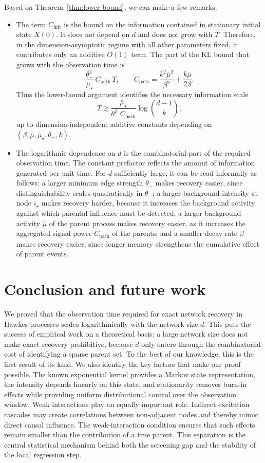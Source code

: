 \documentclass{article}
\newcommand{\thetalo}{\theta_-}
\begin{document}
Based on Theorem~\ref{thm:lower-bound}, we can make a few remarks:
\begin{itemize}
\item The term $C_{\mathrm{init}}$ is the bound on the information contained in stationary initial state $X(0)$. It does \emph{not} depend on $d$ and does not grow with $T$. Therefore, in the dimension-asymptotic regime with all other parameters fixed, it contributes only an additive $O(1)$ term. The part of the KL bound that grows with the observation time is
\[
\frac{\thetalo^2}{\bar\mu_\star}\,C_{\mathrm{path}}\,T,
\qquad
C_{\mathrm{path}}
=
\frac{k^2\bar\mu^2}{\beta^2}
+
\frac{k\bar\mu}{2\beta}.
\]
Thus the lower-bound argument identifies the necessary information scale
\[
T
\gtrsim
\frac{\bar\mu_\star}{\thetalo^2\,C_{\mathrm{path}}}
\log \binom{d-1}{k},
\]
up to dimension-independent additive constants depending on
$(\beta,\bar\mu,\bar\mu_\star,\thetalo,k)$.
\item The logarithmic dependence on \(d\) is the combinatorial part of the required observation time. The constant prefactor reflects the amount of information generated per unit time. For $d$ sufficiently large, it can be read informally as follows: a larger minimum edge strength $\thetalo$ makes recovery easier, since distinguishability scales quadratically in $\thetalo$; a larger background intensity at node $i_\star$ makes recovery harder, because it increases the background activity against which parental influence must be detected; a larger background activity $\bar\mu$ of the parent process makes recovery easier, as it increases the aggregated signal power $C_{\mathrm{path}}$ of the parents; and a smaller decay rate $\beta$ makes recovery easier, since longer memory strengthens the cumulative effect of parent events.
\end{itemize}

\section{Conclusion and future work}
\label{sec: conclusion}
We proved that the observation time required for exact network recovery in Hawkes processes scales logarithmically with the network size $d$.
This puts the success of empirical work on a theoretical basis: a large network size does not make exact recovery prohibitive, because $d$ only enters through the combinatorial cost of identifying a sparse parent set. 
To the best of our knowledge, this is the first result of its kind.
We also identify the key factors that make our proof possible.
The known exponential kernel provides a Markov state representation, the intensity depends linearly on this state, and stationarity removes burn-in effects while providing uniform distributional control over the observation window.
Weak interactions play an equally important role. 
Indirect excitation cascades may create correlations between non-adjacent nodes and thereby mimic direct causal influence. 
The weak-interaction condition ensures that such effects remain smaller than the contribution of a true parent.
This separation is the central statistical mechanism behind both the screening gap and the stability of the local regression step.
\end{document}
